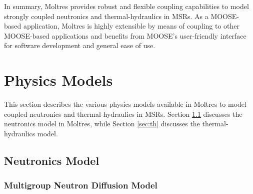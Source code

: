 In summary, Moltres provides robust and flexible coupling capabilities to
model strongly coupled neutronics and thermal-hydraulics in \glspl{MSR}. As a
MOOSE-based application, Moltres is highly extensible by means of coupling to
other MOOSE-based applications and benefits from MOOSE's user-friendly
interface for software development and general ease of use.

\section{Physics Models} \label{sec:moltres-physics}

This section describes the various physics models available in Moltres to model
coupled neutronics and thermal-hydraulics in \glspl{MSR}. Section \ref{sec:nts}
discusses the neutronics model in Moltres, while Section \ref{sec:th} discusses
the thermal-hydraulics model.

\subsection{Neutronics Model} \label{sec:nts}

\subsubsection{Multigroup Neutron Diffusion Model}

